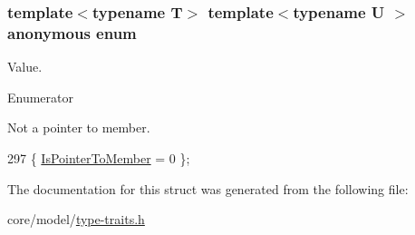 \subsubsection[{\texorpdfstring{anonymous enum}{anonymous enum}}]{\setlength{\rightskip}{0pt plus 5cm}template$<$typename T$>$ template$<$typename U $>$ anonymous enum}\hypertarget{structTypeTraits_1_1PtrToMemberTraits_ac65412cea299498a1da35e4ba0ebcd51}{}\label{structTypeTraits_1_1PtrToMemberTraits_ac65412cea299498a1da35e4ba0ebcd51}
Value. \begin{Desc}
\item[Enumerator]\par
\begin{description}
\item[{\em 
Is\+Pointer\+To\+Member\hypertarget{structTypeTraits_1_1PtrToMemberTraits_ac65412cea299498a1da35e4ba0ebcd51af61f80f131426931b6089817f9867806}{}\label{structTypeTraits_1_1PtrToMemberTraits_ac65412cea299498a1da35e4ba0ebcd51af61f80f131426931b6089817f9867806}
}]Not a pointer to member. \end{description}
\end{Desc}

\begin{DoxyCode}
297 \{ \hyperlink{structTypeTraits_1_1PtrToMemberTraits_ac65412cea299498a1da35e4ba0ebcd51af61f80f131426931b6089817f9867806}{IsPointerToMember} = 0    \};
\end{DoxyCode}


The documentation for this struct was generated from the following file\+:\begin{DoxyCompactItemize}
\item 
core/model/\hyperlink{type-traits_8h}{type-\/traits.\+h}\end{DoxyCompactItemize}
